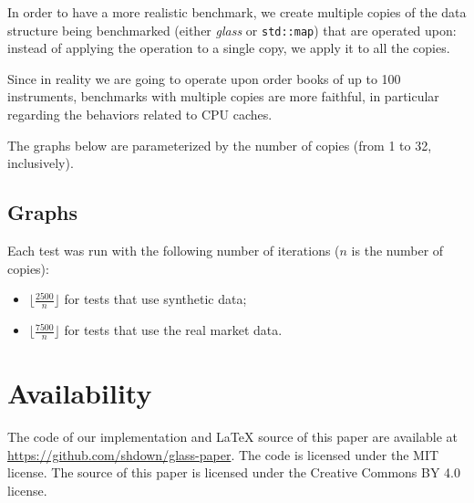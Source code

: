 \documentclass[a4paper,12pt]{article}
\begin{document}
In order to have a more realistic benchmark, we create multiple copies of the data structure being benchmarked
(either \textit{glass} or \texttt{std::map}) that are operated upon: instead of applying the operation to a
single copy, we apply it to all the copies.

Since in reality we are going to operate upon order books of up to 100 instruments,
benchmarks with multiple copies are more faithful, in particular regarding the behaviors related to CPU caches.

The graphs below are parameterized by the number of copies (from 1 to 32, inclusively).

\subsection{Graphs}

Each test was run with the following number of iterations ($n$ is the number of copies):
\begin{itemize}
    \item $\lfloor \frac{2500}{n} \rfloor$ for tests that use synthetic data;
    \item $\lfloor \frac{7500}{n} \rfloor$ for tests that use the real market data.
\end{itemize}



\section{Availability}

The code of our implementation and \LaTeX{} source of this paper
are available at \url{https://github.com/shdown/glass-paper}.
The code is licensed under the MIT license.
The source of this paper is licensed under the Creative Commons BY 4.0 license.

{}

\end{document}

